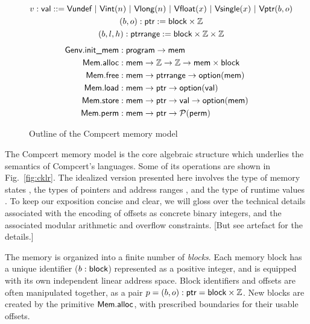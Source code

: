 \begin{figure} %
  \begin{gather*}
    v :  \textsf{val}  ::=
       \textsf{Vundef}  \ |\ 
       \textsf{Vint} (n) \ |\ 
       \textsf{Vlong} (n) \ |\ 
       \textsf{Vfloat} (x) \ |\ 
       \textsf{Vsingle} (x) \ |\ 
       \textsf{Vptr} (b, o)
    \\
    (b, o) :  \textsf{ptr}  :=
       \textsf{block}  \times \mathbb{Z}
    \\
    (b, l, h) :  \textsf{ptrrange}  :=
       \textsf{block}  \times \mathbb{Z} \times \mathbb{Z}
  \end{gather*}
  \begin{align*}
     \textsf{Genv.init\_mem}  &:
         \textsf{program}  \rightarrow  \textsf{mem} 
    \\
     \textsf{Mem.alloc}  &:
       \textsf{mem}  \rightarrow \mathbb{Z} \rightarrow \mathbb{Z} \rightarrow
       \textsf{mem}  \times  \textsf{block} 
    \\
     \textsf{Mem.free}  &:
       \textsf{mem}  \rightarrow
       \textsf{ptrrange}  \rightarrow
       \textsf{option} ( \textsf{mem} )
    \\
     \textsf{Mem.load}  &:
       \textsf{mem}  \rightarrow  \textsf{ptr}  \rightarrow  \textsf{option} ( \textsf{val} )
    \\
     \textsf{Mem.store}  &:
       \textsf{mem}  \rightarrow  \textsf{ptr}  \rightarrow  \textsf{val}  \rightarrow  \textsf{option} ( \textsf{mem} )
    \\
     \textsf{Mem.perm}  &:
       \textsf{mem}  \rightarrow  \textsf{ptr}  \rightarrow \mathcal{P}( \textsf{perm} )
  \end{align*}
  \caption{Outline of the Compcert memory model}
  \label{fig:mm}
\end{figure}

The Compcert memory model \cite{compcertmmv2}
is the core algebraic structure
which underlies the semantics of Compcert's languages.
Some of its operations
are shown in Fig.~\ref{fig:cklr}.
The idealized version presented here
involves
the type of memory states ,
the types of pointers  and address ranges , and
the type of runtime values .
To keep our exposition concise and clear,
we will gloss over the technical details
associated with the encoding of offsets
as concrete binary integers,
and the associated modular arithmetic and overflow constraints.
[But see artefact for the details.]

The memory is organized into a finite number of \emph{blocks}.
Each memory block has a unique identifier ($b :  \textsf{block} $)
represented as a positive integer,
and is equipped with its own independent linear address space.
Block identifiers and offsets are often manipulated together,
as a pair $p = (b, o) :  \textsf{ptr}  =  \textsf{block}  \times \mathbb{Z}$.
New blocks are created by the primitive $ \textsf{Mem.alloc} $,
with prescribed boundaries for their usable offsets.


